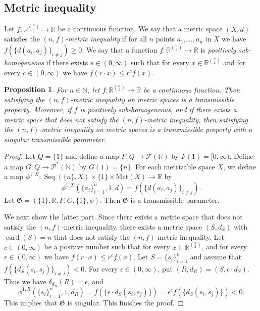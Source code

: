 \documentclass[a4paper, 12pt]{amsart}
\theoremstyle{plain}
\newtheorem{prop}[thm]{Proposition}
\theoremstyle{definition}
\theoremstyle{remark}
\newcommand{\nn}{\mathbb{N}}
\newcommand{\rr}{\mathbb{R}}
\DeclareMathOperator{\card}{card}
\DeclareMathOperator{\seq}{Seq}
\newcommand{\met}[1]{\mathrm{Met}(#1)}
\begin{document}
\subsection{Metric inequality}

Let 
$f\colon  \rr^{\binom{n}{2}}\to \rr$ 
be a continuous function. 
We say that a metric space 
$(X, d)$ 
satisfies the 
\emph{$(n, f)$-metric inequality}
 if 
for all $n$ points 
$a_{1}, \dots, a_{n}$ 
in 
$X$ 
we have 
$f(\{d(a_{i}, a_{j})\}_{i\neq j})\ge 0$. 
We say that a function  
$f\colon \rr^{\binom{n}{2}}\to \rr$ 
is \emph{positively sub-homogeneous} 
if there exists 
$s\in (0, \infty)$ 
such that
for every 
$x\in \rr^{\binom{n}{2}}$ 
and for every 
$c\in (0, \infty)$
we have 
$f(r\cdot x)\le r^{c}f(x)$. 


\begin{prop}\label{prop:inq}
For 
$n\in \nn$, 
let  
$f\colon  \rr^{\binom{n}{2}}\to \rr$ 
be a continuous function. 
Then satisfying the 
$(n, f)$-metric inequality 
on metric spaces is a transmissible  property. 
Moreover, 
if 
$f$
 is positively sub-homogeneous,  
and if  there exists a metric space 
that does not satisfy 
the 
$(n, f)$-metric inequality, 
then satisfying the 
$(n, f)$-metric inequality on metric spaces  
is 
a  transmissible  property 
with a singular transmissible parameter. 
\end{prop}
\begin{proof}
Let
 $Q=\{1\}$ 
and define a map  
$F\colon Q\to \mathcal{F}(\rr)$ 
by 
$F(1)=[0, \infty)$. 
Define a map 
$G\colon  Q\to \mathcal{P}^*(\nn)$ 
by 
$G(1)=\{n\}$. 
For each  metrizable space
 $X$,  
we define a map
$\phi^{1, X}\colon  
\seq(\{n\}, X)\times \{1\}\times \met{X}\to \rr$ 
by 
\[
	\phi^{1, X}(\{a_{i}\}_{i=1}^{n}, 1, d)=f(\{d(a_{i}, a_{j})\}_{i\neq j}). 
\]
Let 
$\mathfrak{G}=(\{1\}, \rr,  F, G, \{1\}, \phi)$. 
Then 
$\mathfrak{G}$ 
is a transmissible parameter. 




We next show the latter part. 
Since there exists a metric space
 that does not satisfy 
  the 
$(n, f)$-metric inequality, 
there exists a metric space 
$(S, d_S)$ 
with 
$\card(S)=n$ 
that does not satisfy the 
$(n, f)$-metric inequality. 
Let 
$c\in (0, \infty)$ 
be a positive number such that for every 
$x\in \rr^{\binom{n}{2}}$, 
and for every 
$r\in (0, \infty)$ 
we have 
$f(r\cdot x)\le r^{c}f(x)$. 
Let 
$S=\{s_{i}\}_{i=1}^n$ 
and assume that 
$f(\{d_{S}(s_{i}, s_{j})\}_{i\neq j})<0$. 
For every 
$\epsilon\in (0, \infty)$,  
put $(R, d_{R})=(S, \epsilon\cdot d_{S})$. 
Thus we have 
$\delta_{d_{R}}(R)=\epsilon$,  
and 
\[
	\phi^{1, R}(\{s_{i}\}_{i=1}^{n}, 1, d_R)=f(\{\epsilon\cdot d_{S}(s_{i}, s_{j})\})
	=\epsilon^cf(\{d_{S}(s_{i}, s_{j})\})<0. 
\]
This implies that 
$\mathfrak{G}$ 
is singular. 
This finishes the proof. 
\end{proof}
\end{document}
